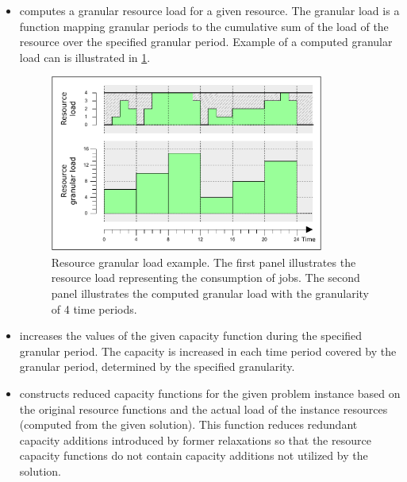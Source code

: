 \begin{itemize}
    \item {}
        computes a granular resource load for a given resource.
        The granular load is a function mapping granular periods to the cumulative sum of the load
        of the resource over the specified granular period.
        Example of a computed granular load can is illustrated in \cref{fig:granular-load}.

        \begin{figure}[bt]
            \centering
            \includegraphics[width=0.85\textwidth]{img/GranularLoad.pdf}
            \caption{
                Resource granular load example.
                The first panel illustrates the resource load representing the consumption of jobs.
                The second panel illustrates the computed granular load with the granularity of 4 time periods.
                }
            \label{fig:granular-load}
        \end{figure}
        
    \item {}
        increases the values of the given capacity function during the specified granular period.
        The capacity is increased in each time period covered by the granular period,
        determined by the specified granularity.

    \item {}
        constructs reduced capacity functions for the given problem instance based on the original resource functions
        and the actual load of the instance resources (computed from the given solution).
        This function reduces redundant capacity additions introduced by former relaxations
        so that the resource capacity functions do not contain capacity additions not utilized by the solution.


\end{itemize}
